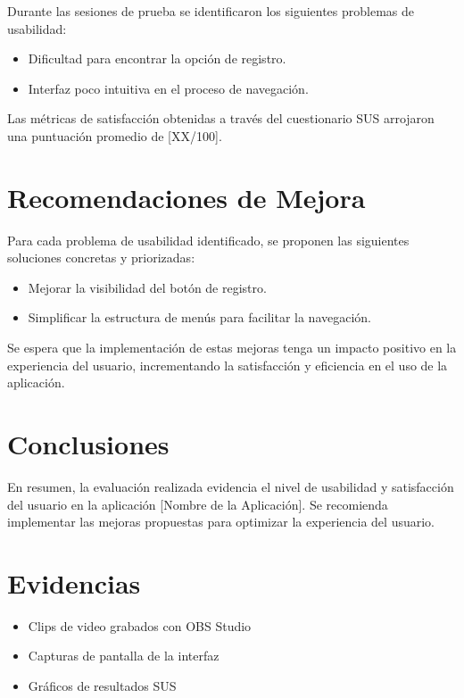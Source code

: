 Durante las sesiones de prueba se identificaron los siguientes problemas de usabilidad:
\begin{itemize}
    \item [Ejemplo] Dificultad para encontrar la opción de registro.
    \item [Ejemplo] Interfaz poco intuitiva en el proceso de navegación.
\end{itemize}

Las métricas de satisfacción obtenidas a través del cuestionario SUS arrojaron una puntuación promedio de [XX/100].

\section{Recomendaciones de Mejora}

Para cada problema de usabilidad identificado, se proponen las siguientes soluciones concretas y priorizadas:
\begin{itemize}
    \item [Ejemplo] Mejorar la visibilidad del botón de registro.
    \item [Ejemplo] Simplificar la estructura de menús para facilitar la navegación.
\end{itemize}

Se espera que la implementación de estas mejoras tenga un impacto positivo en la experiencia del usuario, incrementando la satisfacción y eficiencia en el uso de la aplicación.

\section{Conclusiones}

En resumen, la evaluación realizada evidencia el nivel de usabilidad y satisfacción del usuario en la aplicación [Nombre de la Aplicación]. Se recomienda implementar las mejoras propuestas para optimizar la experiencia del usuario.

\section*{Evidencias}
\begin{itemize}
    \item Clips de video grabados con OBS Studio
    \item Capturas de pantalla de la interfaz
    \item Gráficos de resultados SUS
\end{itemize}
